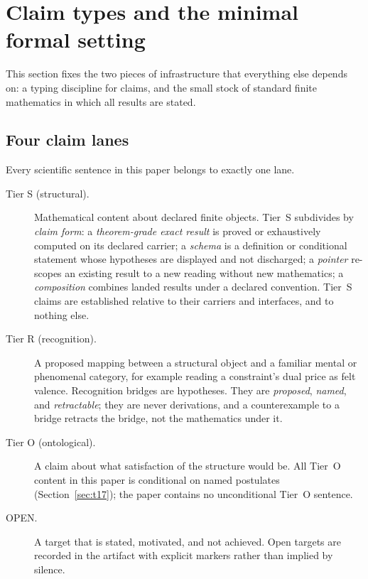 \section{Claim types and the minimal formal setting}
\label{sec:claims}

This section fixes the two pieces of infrastructure that everything else
depends on: a typing discipline for claims, and the small stock of standard
finite mathematics in which all results are stated.

\subsection{Four claim lanes}
\label{sec:lanes}

Every scientific sentence in this paper belongs to exactly one lane.

\begin{description}
\item[Tier S (structural).] Mathematical content about declared finite
objects. Tier~S subdivides by \emph{claim form}: a \emph{theorem-grade exact
result} is proved or exhaustively computed on its declared carrier; a
\emph{schema} is a definition or conditional statement whose hypotheses are
displayed and not discharged; a \emph{pointer} re-scopes an existing result to
a new reading without new mathematics; a \emph{composition} combines landed
results under a declared convention. Tier~S claims are established relative to
their carriers and interfaces, and to nothing else.
\item[Tier R (recognition).] A proposed mapping between a structural object
and a familiar mental or phenomenal category, for example reading a
constraint's dual price as felt valence. Recognition bridges are hypotheses.
They are \emph{proposed}, \emph{named}, and \emph{retractable}; they are never
derivations, and a counterexample to a bridge retracts the bridge, not the
mathematics under it.
\item[Tier O (ontological).] A claim about what satisfaction of the structure
would be. All Tier~O content in this paper is conditional on named postulates
(Section~\ref{sec:t17}); the paper contains no unconditional Tier~O sentence.
\item[OPEN.] A target that is stated, motivated, and not achieved. Open
targets are recorded in the artifact with explicit markers rather than
implied by silence.
\end{description}

